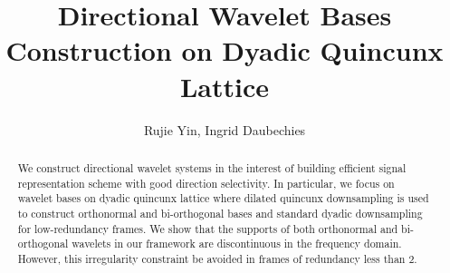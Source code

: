\documentclass[]{article}
\begin{document}
\newtheorem{lem}{Lemma}
\newtheorem*{mydef}{Definition}
\newtheorem{thm}{Theorem}
\newtheorem{prop}{Proposition}
\newtheorem*{notat}{Notation}

\abovedisplayskip=2pt
\belowdisplayskip=2pt
\abovedisplayshortskip=2pt
\belowdisplayshortskip=2pt


\title{Directional Wavelet Bases Construction on Dyadic Quincunx Lattice}
\author{Rujie Yin, Ingrid Daubechies}
\maketitle

\begin{abstract}
We construct directional wavelet systems in the interest of building efficient signal representation scheme with good direction selectivity. In particular, we focus on wavelet bases on dyadic quincunx lattice where dilated quincunx downsampling is used to construct orthonormal and bi-orthogonal bases and standard dyadic downsampling for low-redundancy frames. We show that the supports of both orthonormal and bi-orthogonal wavelets in our framework are discontinuous in the frequency domain. However, this irregularity constraint be avoided in frames of redundancy less than 2. 
\end{abstract}




%


%


%


%


%

\begin{appendices}


%
%
\end{appendices}


\end{document}
